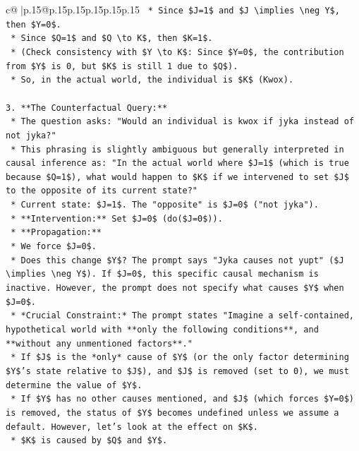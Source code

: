 \documentclass{article}
\begin{document}
{\begin{supertabular}{c@{$\;$}|p{.15\linewidth}@{}p{.15\linewidth}p{.15\linewidth}p{.15\linewidth}p{.15\linewidth}p{.15\linewidth}}
{{{\texttt{        *   Since \$J=1\$ and \$J \textbackslash{}implies \textbackslash{}neg Y\$, then \$Y=0\$.} \\
\texttt{        *   Since \$Q=1\$ and \$Q \textbackslash{}to K\$, then \$K=1\$.} \\
\texttt{        *   (Check consistency with \$Y \textbackslash{}to K\$: Since \$Y=0\$, the contribution from \$Y\$ is 0, but \$K\$ is still 1 due to \$Q\$).} \\
\texttt{    *   So, in the actual world, the individual is \$K\$ (Kwox).} \\
\\ 
\texttt{3.  **The Counterfactual Query:**} \\
\texttt{    *   The question asks: "Would an individual is kwox if jyka instead of not jyka?"} \\
\texttt{    *   This phrasing is slightly ambiguous but generally interpreted in causal inference as: "In the actual world where \$J=1\$ (which is true because \$Q=1\$), what would happen to \$K\$ if we intervened to set \$J\$ to the opposite of its current state?"} \\
\texttt{    *   Current state: \$J=1\$. The "opposite" is \$J=0\$ ("not jyka").} \\
\texttt{    *   **Intervention:** Set \$J=0\$ (do(\$J=0\$)).} \\
\texttt{    *   **Propagation:**} \\
\texttt{        *   We force \$J=0\$.} \\
\texttt{        *   Does this change \$Y\$? The prompt says "Jyka causes not yupt" (\$J \textbackslash{}implies \textbackslash{}neg Y\$). If \$J=0\$, this specific causal mechanism is inactive. However, the prompt does not specify what causes \$Y\$ when \$J=0\$.} \\
\texttt{        *   *Crucial Constraint:* The prompt states "Imagine a self{-}contained, hypothetical world with **only the following conditions**, and **without any unmentioned factors**."} \\
\texttt{        *   If \$J\$ is the *only* cause of \$Y\$ (or the only factor determining \$Y\$'s state relative to \$J\$), and \$J\$ is removed (set to 0), we must determine the value of \$Y\$.} \\
\texttt{        *   If \$Y\$ has no other causes mentioned, and \$J\$ (which forces \$Y=0\$) is removed, the status of \$Y\$ becomes undefined unless we assume a default. However, let's look at the effect on \$K\$.} \\
\texttt{        *   \$K\$ is caused by \$Q\$ and \$Y\$.} \\
}}}
\end{supertabular}}
\end{document}
